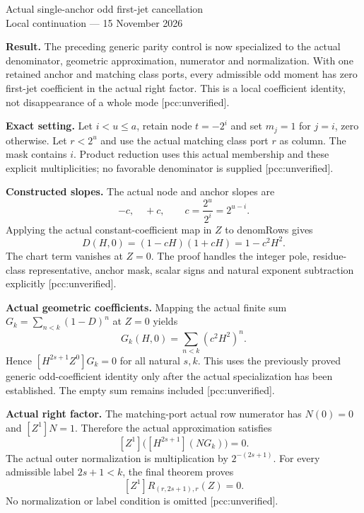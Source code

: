 \documentclass[10pt]{article}
\begin{document}
\begin{center}{\Large Actual single-anchor odd first-jet cancellation}\\[4pt]
Local continuation --- 15 November 2026\end{center}
\textbf{Result.} The preceding generic parity control is now specialized to
the actual denominator, geometric approximation, numerator and normalization.
With one retained anchor and matching class ports, every admissible odd
moment has zero first-jet coefficient in the actual right factor. This is a
local coefficient identity, not disappearance of a whole mode
[pcc:unverified].

\textbf{Exact setting.} Let $i<u\le a$, retain node $t=-2^i$ and set
$m_j=1$ for $j=i$, zero otherwise. Let $r<2^u$ and use the actual matching
class port $r$ as column. The mask contains $i$. Product reduction uses this
actual membership and these explicit multiplicities; no favorable denominator
is supplied [pcc:unverified].

\textbf{Constructed slopes.} The actual node and anchor slopes are
\[
 -c,\quad+c,\qquad c=\frac{2^u}{2^i}=2^{u-i}.
\]
Applying the actual constant-coefficient map in $Z$ to denomRows gives
\[
 D(H,0)=(1-cH)(1+cH)=1-c^2H^2.
\]
The chart term vanishes at $Z=0$. The proof handles the integer pole,
residue-class representative, anchor mask, scalar signs and natural exponent
subtraction explicitly [pcc:unverified].

\textbf{Actual geometric coefficients.} Mapping the actual finite sum
$G_k=\sum_{n<k}(1-D)^n$ at $Z=0$ yields
\[
 G_k(H,0)=\sum_{n<k}(c^2H^2)^n.
\]
Hence $[H^{2s+1}Z^0]G_k=0$ for all natural $s,k$. This uses the previously
proved generic odd-coefficient identity only after the actual specialization
has been established. The empty sum remains included [pcc:unverified].

\textbf{Actual right factor.} The matching-port actual row numerator has
$N(0)=0$ and $[Z^1]N=1$. Therefore the actual approximation satisfies
\[
 [Z^1]\bigl([H^{2s+1}](N G_k)\bigr)=0.
\]
The actual outer normalization is multiplication by $2^{-(2s+1)}$.
For every admissible label $2s+1<k$, the final theorem proves
\[
 [Z^1]R_{(r,2s+1),r}(Z)=0.
\]
No normalization or label condition is omitted [pcc:unverified].
\end{document}
